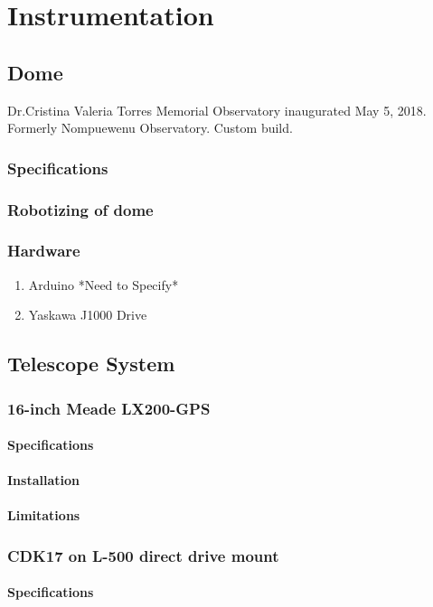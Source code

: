 \chapter{Instrumentation}
\section{Dome}
Dr.Cristina Valeria Torres Memorial Observatory inaugurated May 5, 2018.
Formerly Nompuewenu Observatory.
Custom build.
\subsection{Specifications}
\subsection{Robotizing of dome}
\subsection{Hardware}
\begin{enumerate}
    \item Arduino *Need to Specify* 
    \item Yaskawa J1000 Drive
\end{enumerate}

\section{Telescope System}
\subsection{16-inch Meade LX200-GPS}
\subsubsection{Specifications}
\subsubsection{Installation}
\subsubsection{Limitations}

\subsection{CDK17 on L-500 direct drive mount}
\subsubsection{Specifications}
